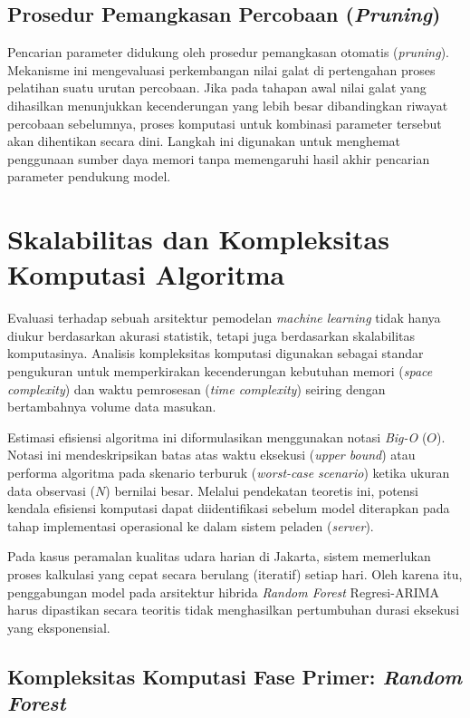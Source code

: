 \subsection{Prosedur Pemangkasan Percobaan (\textit{Pruning})}

Pencarian parameter didukung oleh prosedur pemangkasan otomatis (\textit{pruning}). Mekanisme ini mengevaluasi perkembangan nilai galat di pertengahan proses pelatihan suatu urutan percobaan. Jika pada tahapan awal nilai galat yang dihasilkan menunjukkan kecenderungan yang lebih besar dibandingkan riwayat percobaan sebelumnya, proses komputasi untuk kombinasi parameter tersebut akan dihentikan secara dini. Langkah ini digunakan untuk menghemat penggunaan sumber daya memori tanpa memengaruhi hasil akhir pencarian parameter pendukung model.

\section{Skalabilitas dan Kompleksitas Komputasi Algoritma}

Evaluasi terhadap sebuah arsitektur pemodelan \textit{machine learning} tidak hanya diukur berdasarkan akurasi statistik, tetapi juga berdasarkan skalabilitas komputasinya. Analisis kompleksitas komputasi digunakan sebagai standar pengukuran untuk memperkirakan kecenderungan kebutuhan memori (\textit{space complexity}) dan waktu pemrosesan (\textit{time complexity}) seiring dengan bertambahnya volume data masukan.

Estimasi efisiensi algoritma ini diformulasikan menggunakan notasi \textit{Big-O} ($O$). Notasi ini mendeskripsikan batas atas waktu eksekusi (\textit{upper bound}) atau performa algoritma pada skenario terburuk (\textit{worst-case scenario}) ketika ukuran data observasi ($N$) bernilai besar. Melalui pendekatan teoretis ini, potensi kendala efisiensi komputasi dapat diidentifikasi sebelum model diterapkan pada tahap implementasi operasional ke dalam sistem peladen (\textit{server}).

Pada kasus peramalan kualitas udara harian di Jakarta, sistem memerlukan proses kalkulasi yang cepat secara berulang (iteratif) setiap hari. Oleh karena itu, penggabungan model pada arsitektur hibrida \textit{Random Forest} Regresi-ARIMA harus dipastikan secara teoritis tidak menghasilkan pertumbuhan durasi eksekusi yang eksponensial.

\subsection{Kompleksitas Komputasi Fase Primer: \textit{Random Forest}}

